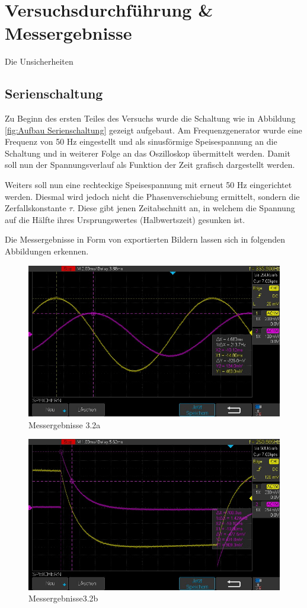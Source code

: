 \documentclass[12pt,a4paper,twoside]{article}
\begin{document}
\section{Versuchsdurchführung \& Messergebnisse} %

Die Unsicherheiten

\subsection{Serienschaltung}

Zu Beginn des ersten Teiles des Versuchs wurde die Schaltung wie in Abbildung \ref{fig:Aufbau Serienschaltung} gezeigt aufgebaut. 
Am Frequenzgenerator wurde eine Frequenz von 50 Hz eingestellt und als sinusförmige Speisespannung an die Schaltung und in weiterer Folge an das Oszilloskop übermittelt werden. Damit soll nun der Spannungsverlauf als Funktion der Zeit grafisch dargestellt werden. \newline

\noindent
Weiters soll nun eine rechteckige Speisespannung mit erneut 50 Hz eingerichtet werden. Diesmal wird jedoch nicht die Phasenverschiebung ermittelt, sondern die Zerfallskonstante $\tau$.
Diese gibt jenen Zeitabschnitt an, in welchem die Spannung auf die Hälfte ihres Ursprungswertes (Halbwertszeit) gesunken ist. \newline

\noindent
Die Messergebnisse in Form von exportierten Bildern lassen sich in folgenden Abbildungen erkennen.

\begin{figure}[H]
    \centering
    \includegraphics[width=0.6\linewidth, angle=0]{Messergebnisse/3.2/3.2a besser.jpg}
    \caption{Messergebnisse 3.2a}
    \label{fig:Messergebnisse3.2a}
\end{figure}

\begin{figure}[H]
    \centering
    \includegraphics[width=0.6\linewidth, angle=0]{Messergebnisse/3.2/3.2b.jpg}
    \caption{Messergebnisse3.2b}
    \label{fig:Messergebnisse3.2b}
\end{figure}
\end{document}
